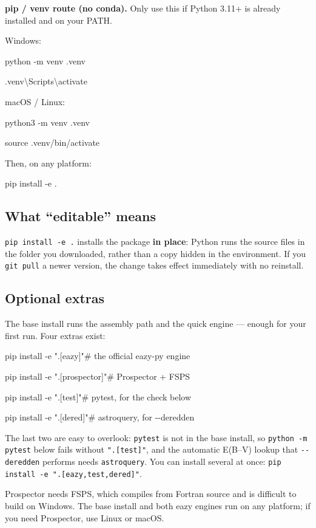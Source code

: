 \documentclass[11pt]{article}
\newcommand{\cmdline}[1]{\begin{cmd}\ttfamily #1\end{cmd}}
\begin{document}
\textbf{pip / venv route (no conda).} Only use this if Python 3.11+ is
already installed and on your PATH.

Windows:

\cmdline{python -m venv .venv}

\cmdline{.venv\textbackslash Scripts\textbackslash activate}

macOS / Linux:

\cmdline{python3 -m venv .venv}

\cmdline{source .venv/bin/activate}

Then, on any platform:

\cmdline{pip install -e .}

\subsection{What \enquote{editable} means}

\texttt{pip install -e .} installs the package \textbf{in place}: Python
runs the source files in the folder you downloaded, rather than a copy
hidden in the environment. If you \texttt{git pull} a newer version, the
change takes effect immediately with no reinstall.

\subsection{Optional extras}

The base install runs the assembly path and the quick engine --- enough
for your first run. Four extras exist:

\cmdline{pip install -e ".[eazy]"\qquad\# the official eazy-py engine}

\cmdline{pip install -e ".[prospector]"\qquad\# Prospector + FSPS}

\cmdline{pip install -e ".[test]"\qquad\# pytest, for the check below}

\cmdline{pip install -e ".[dered]"\qquad\# astroquery, for -{}-deredden}

The last two are easy to overlook: \texttt{pytest} is not in the base
install, so \texttt{python -m pytest} below fails without
\texttt{".[test]"}, and the automatic E(B--V) lookup that
\texttt{-{}-deredden} performs needs \texttt{astroquery}. You can install
several at once: \texttt{pip install -e ".[eazy,test,dered]"}.

\begin{warnbox}
Prospector needs FSPS, which compiles from Fortran source and is
difficult to build on Windows. The base install and both eazy engines run
on any platform; if you need Prospector, use Linux or macOS.
\end{warnbox}
\end{document}

